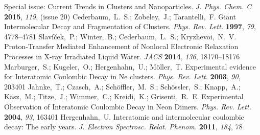 \documentclass[journal=jpccck,manuscript=article]{achemso}
\begin{document}
\begin{mcitethebibliography}{73}
Special issue: Current Trends in Clusters and Nanoparticles. \emph{J. Phys.
  Chem. C} \textbf{2015}, \emph{119}, (issue 20)\relax
\mciteBstWouldAddEndPuncttrue
\mciteSetBstMidEndSepPunct{\mcitedefaultmidpunct}
{\mcitedefaultendpunct}{\mcitedefaultseppunct}\relax
\EndOfBibitem
{}
Cederbaum,~L.~S.; Zobeley,~J.; Tarantelli,~F. Giant Intermolecular Decay and
  Fragmentation of Clusters. \emph{Phys. Rev. Lett.} \textbf{1997}, \emph{79},
  4778--4781\relax
\mciteBstWouldAddEndPuncttrue
\mciteSetBstMidEndSepPunct{\mcitedefaultmidpunct}
{\mcitedefaultendpunct}{\mcitedefaultseppunct}\relax
\EndOfBibitem
{}
Slav\'{i}\v{c}ek,~P.; Winter,~B.; Cederbaum,~L.~S.; Kryzhevoi,~N.~V.
  Proton-Transfer Mediated Enhancement of Nonlocal Electronic Relaxation
  Processes in X-ray Irradiated Liquid Water. \emph{JACS} \textbf{2014},
  \emph{136}, 18170--18176\relax
\mciteBstWouldAddEndPuncttrue
\mciteSetBstMidEndSepPunct{\mcitedefaultmidpunct}
{\mcitedefaultendpunct}{\mcitedefaultseppunct}\relax
\EndOfBibitem
{}
Marburger,~S.; Kugeler,~O.; Hergenhahn,~U.; M\"oller,~T. Experimental evidence
  for Interatomic Coulombic Decay in Ne clusters. \emph{Phys. Rev. Lett.}
  \textbf{2003}, \emph{90}, 203401\relax
\mciteBstWouldAddEndPuncttrue
\mciteSetBstMidEndSepPunct{\mcitedefaultmidpunct}
{\mcitedefaultendpunct}{\mcitedefaultseppunct}\relax
\EndOfBibitem
{}
Jahnke,~T.; Czasch,~A.; Sch\"offler,~M.~S.; Sch\"ossler,~S.; Knapp,~A.;
  K\"asz,~M.; Titze,~J.; Wimmer,~C.; Kreidi,~K.; Grisenti,~R.~E. 
   Experimental Observation of Interatomic Coulombic Decay in Neon Dimers.
  \emph{Phys. Rev. Lett.} \textbf{2004}, \emph{93}, 163401\relax
\mciteBstWouldAddEndPuncttrue
\mciteSetBstMidEndSepPunct{\mcitedefaultmidpunct}
{\mcitedefaultendpunct}{\mcitedefaultseppunct}\relax
\EndOfBibitem
{}
Hergenhahn,~U. Interatomic and intermolecular coulombic decay: The early years.
  \emph{J. Electron Spectrosc. Relat. Phenom.} \textbf{2011}, \emph{184},
  78\relax
\mciteBstWouldAddEndPuncttrue
\mciteSetBstMidEndSepPunct{\mcitedefaultmidpunct}
{\mcitedefaultendpunct}{\mcitedefaultseppunct}\relax

\end{mcitethebibliography}
\end{document}
